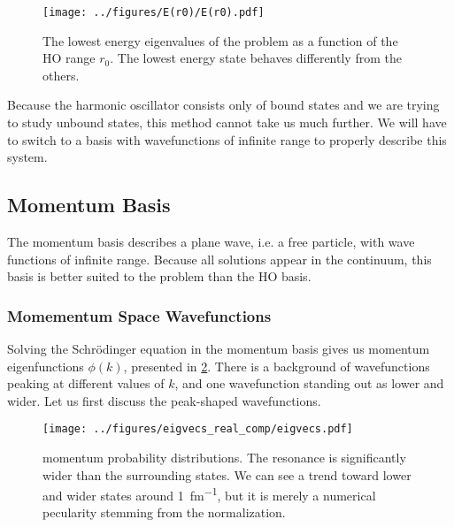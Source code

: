 \documentclass[../main/report.tex]{subfiles}
\begin{document}

\begin{figure}[hb]
  \centering
 	\texttt{[image: ../figures/E(r0)/E(r0).pdf]}
  \caption{The lowest energy eigenvalues of the  problem as a function of the HO range $r_0$. The lowest energy state behaves differently from the others.}
  \label{fig:energies(r0)}
\end{figure}


Because the harmonic oscillator consists only of bound states and we are trying to study unbound states, this method cannot take us much further.
We will have to switch to a basis with wavefunctions of infinite range to properly describe this system.

\subsection{Momentum Basis}
\label{sub:momentum_basis}

The momentum basis describes a plane wave, i.e. a free particle, with wave functions of infinite range.
Because all  solutions appear in the continuum, this basis is better suited to the problem than the HO basis.

\subsubsection{Momementum Space Wavefunctions}

Solving the Schrödinger equation in the momentum basis gives us momentum eigenfunctions $\phi(k)$, presented in \cref{fig:real_momentum_wavefunctions}.
There is a background of wavefunctions peaking at different values of $k$, and one wavefunction standing out as lower and wider. Let us first discuss the peak-shaped wavefunctions.


\begin{figure}[h]
  \centering
  	\texttt{[image: ../figures/eigvecs\_real\_comp/eigvecs.pdf]}

  \caption{ momentum probability distributions. The resonance is significantly wider than the surrounding states. We can see a trend toward lower and wider states around \SI{1}{fm^{-1}}, but it is merely a numerical pecularity stemming from the normalization.} 
  \label{fig:real_momentum_wavefunctions}
\end{figure}
\end{document}
